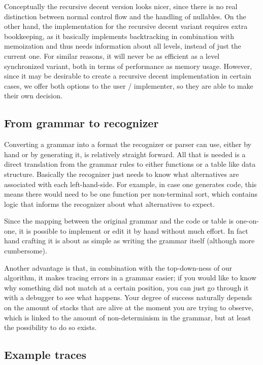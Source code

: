 \documentclass[a4paper,10pt]{article}
\begin{document}
Conceptually the recursive decent version looks nicer, since there is no real distinction between normal control flow and the handling of nullables. On the other hand, the implementation for the recursive decent variant requires extra bookkeeping, as it basically implements backtracking in combination with memoization and thus needs information about all levels, instead of just the current one. For similar reasons, it will never be as efficient as a level synchronized variant, both in terms of performance as memory usage. However, since it may be desirable to create a recursive decent implementation in certain cases, we offer both options to the user / implementer, so they are able to make their own decision.

\subsection{From grammar to recognizer}

Converting a grammar into a format the recognizer or parser can use, either by hand or by generating it, is relatively straight forward. All that is needed is a direct translation from the grammar rules to either functions or a table like data structure. Basically the recognizer just needs to know what alternatives are associated with each left-hand-side. For example, in case one generates code, this means there would need to be one function per non-terminal sort, which contains logic that informs the recognizer about what alternatives to expect.

Since the mapping between the original grammar and the code or table is one-on-one, it is possible to implement or edit it by hand without much effort. In fact hand crafting it is about as simple as writing the grammar itself (although more cumbersome).

Another advantage is that, in combination with the top-down-ness of our algorithm, it makes tracing errors in a grammar easier; if you would like to know why something did not match at a certain position, you can just go through it with a debugger to see what happens. Your degree of success naturally depends on the amount of stacks that are alive at the moment you are trying to observe, which is linked to the amount of non-determinism in the grammar, but at least the possibility to do so exists.

\subsection{Example traces}
\end{document}
